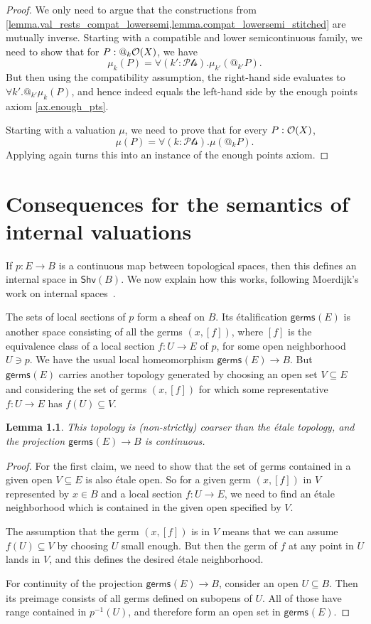 \documentclass[11pt, oneside, article]{memoir}
\makeatletter
\theoremstyle{plain}
\newtheorem{lemma}[theorem]{Lemma}
\theoremstyle{definition}
\theoremstyle{remark}
\renewcommand{\ss}{\subseteq}
\newcommand{\Fun}[1]{\mathsf{#1}}
\newcommand{\germs}[2]{\mathsf{germs}_{#2}({#1})}
\newcommand{\shv}{\Fun{Shv}}
\newcommand{\Op}[1][undef]{\ifthenelse{\equal{#1}{undef}}{\mathcal{O}}{\mathcal{O}(#1)}}
\newcommand{\pt}{k}				%
\newcommand{\Pts}{\mathcal{Pts}}		%
\newcommand{\AtSymbol}{{@}}
\newcommand{\At}[1][\pt]{\AtSymbol_{#1}}
\makeatother
\begin{document}
\begin{proof}
	We only need to argue that the constructions from \cref{lemma.val_rests_compat_lowersemi,lemma.compat_lowersemi_stitched} are mutually inverse. Starting with a compatible and lower semicontinuous family, we need to show that for $P : \At \Op[X]$, we have
	\[
		\mu_\pt(P) = \forall (\pt' : \Pts) . \mu_{\pt'}( \At[\pt'] P).
	\]
	But then using the compatibility assumption, the right-hand side evaluates to $\forall \pt' . \At[\pt'] \mu_\pt(P)$, and hence indeed equals the left-hand side by the enough points axiom \ref{ax.enough_pts}.

	Starting with a valuation $\mu$, we need to prove that for every $P : \Op[X]$,
	\[
		\mu(P) = \forall (\pt : \Pts) . \mu(\At P).
	\]
	Applying  again turns this into an instance of the enough points axiom.
\end{proof}

\chapter{Consequences for the semantics of internal valuations}

If $p : E \to B$ is a continuous map between topological spaces, then this defines an internal space in $\shv(B)$. We now explain how this works, following Moerdijk's work on internal spaces~\cite{moerdijk1984spaced}.

The sets of local sections of $p$ form a sheaf on $B$. Its \'etalification $\germs{E}{}$ is another space consisting of all the germs $(x,[f])$, where $[f]$ is the equivalence class of a local section $f\colon U\to E$ of $p$, for some open neighborhood $U\ni p$. We have the usual local homeomorphism $\germs{E}{} \to B$. But $\germs{E}{}$ carries another topology generated by choosing an open set $V\ss E$ and considering the set of germs $(x,[f])$ for which some representative $f\colon U\to E$ has $f(U)\ss V$.

\begin{lemma}
	This topology is (non-strictly) coarser than the \'etale topology, and the projection $\germs{E}{} \to B$ is continuous.
\end{lemma}

\begin{proof}
	For the first claim, we need to show that the set of germs contained in a given open $V \subseteq E$ is also \'etale open. So for a given germ $(x,[f])$ in $V$ represented by $x \in B$ and a local section $f : U \to E$, we need to find an \'etale neighborhood which is contained in the given open specified by $V$.

	The assumption that the germ $(x,[f])$ is in $V$ means that we can assume $f(U) \subseteq V$ by choosing $U$ small enough. But then the germ of $f$ at any point in $U$ lands in $V$, and this defines the desired \'etale neighborhood.

	For continuity of the projection $\germs{E}{} \to B$, consider an open $U \subseteq B$. Then its preimage consists of all germs defined on subopens of $U$. All of those have range contained in $p^{-1}(U)$, and therefore form an open set in $\germs{E}{}$.
\end{proof}
\end{document}
